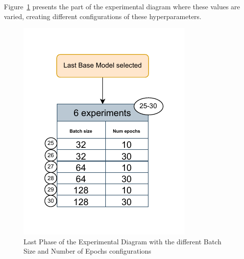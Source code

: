 Figure~\ref{D5} presents the part of the experimental diagram where these values are varied, creating different configurations of these hyperparameters.

\begin{figure}[htbp]
    \centering
    \includegraphics[width=7 cm]{5_ChapterDesign/figuras/Diagrams/D5.pdf}
    \caption{Last Phase of the Experimental Diagram with the different Batch Size and Number of Epochs configurations}
    \label{D5}
\end{figure}